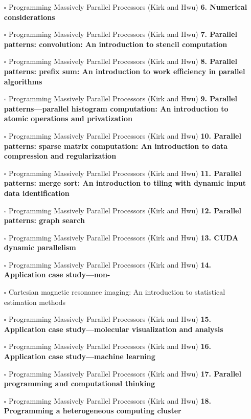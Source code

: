 \documentclass[a4, landscape, 12pt]{article}
\newcommand{\checkbox}{$\square$}%
\begin{document}
\begin{itemize}
{}
\item [\checkbox]  Programming Massively Parallel Processors (Kirk and Hwu) \textbf{ 6. Numerical considerations
}
\item [\checkbox]  Programming Massively Parallel Processors (Kirk and Hwu) \textbf{ 7. Parallel patterns: convolution: An introduction to stencil computation
}
\item [\checkbox]  Programming Massively Parallel Processors (Kirk and Hwu) \textbf{ 8. Parallel patterns: prefix sum: An introduction to work efficiency in parallel algorithms
}
\item [\checkbox]  Programming Massively Parallel Processors (Kirk and Hwu) \textbf{ 9. Parallel patterns—parallel histogram computation: An introduction to atomic operations and privatization
}
\item [\checkbox]  Programming Massively Parallel Processors (Kirk and Hwu) \textbf{ 10. Parallel patterns: sparse matrix computation: An introduction to data compression and regularization
}
\item [\checkbox]  Programming Massively Parallel Processors (Kirk and Hwu) \textbf{ 11. Parallel patterns: merge sort: An introduction to tiling with dynamic input data identification
}
\item [\checkbox]  Programming Massively Parallel Processors (Kirk and Hwu) \textbf{ 12. Parallel patterns: graph search
}
\item [\checkbox]  Programming Massively Parallel Processors (Kirk and Hwu) \textbf{ 13. CUDA dynamic parallelism
}
\item [\checkbox]  Programming Massively Parallel Processors (Kirk and Hwu) \textbf{ 14. Application case study—non-
}
\item [\checkbox]  Cartesian magnetic resonance imaging: An introduction to statistical estimation methods
\item [\checkbox] Programming Massively Parallel Processors (Kirk and Hwu) \textbf{ 15. Application case study—molecular visualization and analysis
}
\item [\checkbox]  Programming Massively Parallel Processors (Kirk and Hwu) \textbf{ 16. Application case study—machine learning
}
\item [\checkbox]  Programming Massively Parallel Processors (Kirk and Hwu) \textbf{ 17. Parallel programming and computational thinking
}
\item [\checkbox]  Programming Massively Parallel Processors (Kirk and Hwu) \textbf{ 18. Programming a heterogeneous computing cluster
}
\end{itemize}
\end{document}

